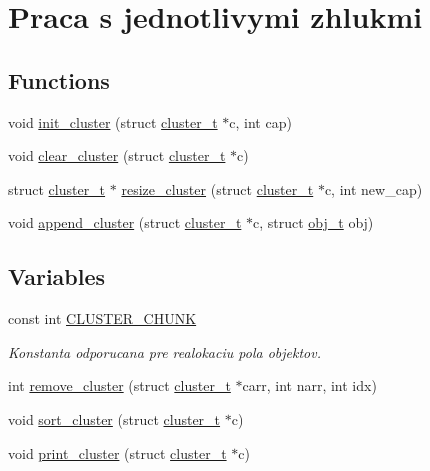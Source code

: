 \hypertarget{group__clust}{}\section{Praca s jednotlivymi zhlukmi}
\label{group__clust}
\subsection*{Functions}
\begin{DoxyCompactItemize}
\item 
void \hyperlink{group__clust_ga96db0862471d90abb3d80103ef3695f7}{init\+\_\+cluster} (struct \hyperlink{structcluster__t}{cluster\+\_\+t} $\ast$c, int cap)
\item 
void \hyperlink{group__clust_ga8289f092f205baeb13cf33cfffa15324}{clear\+\_\+cluster} (struct \hyperlink{structcluster__t}{cluster\+\_\+t} $\ast$c)
\item 
struct \hyperlink{structcluster__t}{cluster\+\_\+t} $\ast$ \hyperlink{group__clust_ga0d8702f8bee3bccb81380e012a615a3d}{resize\+\_\+cluster} (struct \hyperlink{structcluster__t}{cluster\+\_\+t} $\ast$c, int new\+\_\+cap)
\item 
void \hyperlink{group__clust_gab6269b64b2c7f4842a51c58b2d86a2e5}{append\+\_\+cluster} (struct \hyperlink{structcluster__t}{cluster\+\_\+t} $\ast$c, struct \hyperlink{structobj__t}{obj\+\_\+t} obj)
\end{DoxyCompactItemize}
\subsection*{Variables}
\begin{DoxyCompactItemize}
\item 
\mbox{\label{group__clust_gafb09f2bf4615f5ac7a91807aa086d4c3}} 
const int \hyperlink{group__clust_gafb09f2bf4615f5ac7a91807aa086d4c3}{C\+L\+U\+S\+T\+E\+R\+\_\+\+C\+H\+U\+NK}
\begin{DoxyCompactList}\small\item\em Konstanta odporucana pre realokaciu pola objektov. \end{DoxyCompactList}\end{DoxyCompactItemize}
\begin{DoxyCompactItemize}
\item 
int \hyperlink{group__clust_gaf73744f9128e4605127b40932a730a48}{remove\+\_\+cluster} (struct \hyperlink{structcluster__t}{cluster\+\_\+t} $\ast$carr, int narr, int idx)
\end{DoxyCompactItemize}
\begin{DoxyCompactItemize}
\item 
void \hyperlink{group__clust_ga12718af9e3e31b61bf703ec260e22450}{sort\+\_\+cluster} (struct \hyperlink{structcluster__t}{cluster\+\_\+t} $\ast$c)
\item 
void \hyperlink{group__clust_ga322bfd43ab7a3fa830cd69e79b7eef06}{print\+\_\+cluster} (struct \hyperlink{structcluster__t}{cluster\+\_\+t} $\ast$c)
\end{DoxyCompactItemize}


